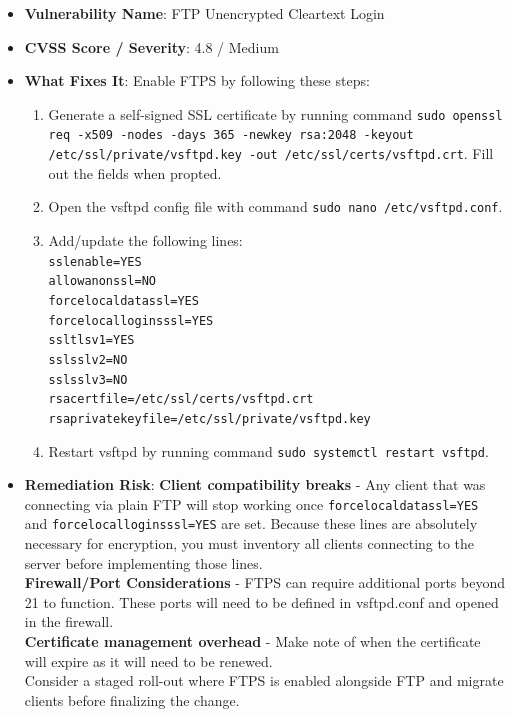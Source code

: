 \documentclass[12pt]{article}
\begin{document}
\begin{itemize}
    \item \textbf{Vulnerability Name}: FTP Unencrypted Cleartext Login
    \item \textbf{CVSS Score / Severity}: 4.8 / Medium
    \item \textbf{What Fixes It}: Enable FTPS by following these steps:
        \begin{enumerate}
            \item Generate a self-signed SSL certificate by running command \texttt{sudo openssl req -x509 -nodes -days 365 -newkey rsa:2048 -keyout /etc/ssl/private/vsftpd.key -out /etc/ssl/certs/vsftpd.crt}. Fill out the fields when propted.
            \item Open the vsftpd config file with command \texttt{sudo nano /etc/vsftpd.conf}.
            \item Add/update the following lines:\\
                \texttt{ssl\underbar{   }enable=YES}\\
                \texttt{allow\underbar{   }anon\underbar{   }ssl=NO}\\
                \texttt{force\underbar{   }local\underbar{   }data\underbar{   }ssl=YES}\\
                \texttt{force\underbar{   }local\underbar{   }logins\underbar{   }ssl=YES}\\
                \texttt{ssl\underbar{   }tlsv1=YES}\\
                \texttt{ssl\underbar{   }sslv2=NO}\\
                \texttt{ssl\underbar{   }sslv3=NO}\\
                \texttt{rsa\underbar{   }cert\underbar{   }file=/etc/ssl/certs/vsftpd.crt}\\
                \texttt{rsa\underbar{   }private\underbar{   }key\underbar{   }file=/etc/ssl/private/vsftpd.key}
            \item Restart vsftpd by running command \texttt{sudo systemctl restart vsftpd}.    
        \end{enumerate}
    \item \textbf{Remediation Risk}: \textbf{Client compatibility breaks} - Any client that was connecting via plain FTP will stop working once \texttt{force\underbar{   }local\underbar{   }data\underbar{   }ssl=YES} and \texttt{force\underbar{   }local\underbar{   }logins\underbar{   }ssl=YES} are set. Because these lines are absolutely necessary for encryption, you must inventory all clients connecting to the server before implementing those lines.\\ \textbf{Firewall/Port Considerations} - FTPS can require additional ports beyond 21 to function. These ports will need to be defined in vsftpd.conf and opened in the firewall.\\ \textbf{Certificate management overhead} - Make note of when the certificate will expire as it will need to be renewed.\\ Consider a staged roll-out where FTPS is enabled alongside FTP and migrate clients before finalizing the change.

\end{itemize}
\end{document}
